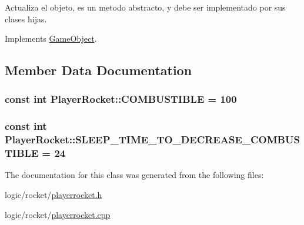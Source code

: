 Actualiza el objeto, es un metodo abstracto, y debe ser implementado por sus clases hijas. 



Implements \hyperlink{class_game_object_ae83128d0e0efef691417779605ee037c}{Game\-Object}.



\subsection{Member Data Documentation}
\hypertarget{class_player_rocket_a6f6bd540c91552c079a394e34d25f2c8}{
\subsubsection[{C\-O\-M\-B\-U\-S\-T\-I\-B\-L\-E}]{\setlength{\rightskip}{0pt plus 5cm}const int Player\-Rocket\-::\-C\-O\-M\-B\-U\-S\-T\-I\-B\-L\-E = 100\hspace{0.3cm}{\ttfamily [static]}}}\label{class_player_rocket_a6f6bd540c91552c079a394e34d25f2c8}
\hypertarget{class_player_rocket_aa3f048b7f984ee944f8daeb35cc748c2}{
\subsubsection[{S\-L\-E\-E\-P\-\_\-\-T\-I\-M\-E\-\_\-\-T\-O\-\_\-\-D\-E\-C\-R\-E\-A\-S\-E\-\_\-\-C\-O\-M\-B\-U\-S\-T\-I\-B\-L\-E}]{\setlength{\rightskip}{0pt plus 5cm}const int Player\-Rocket\-::\-S\-L\-E\-E\-P\-\_\-\-T\-I\-M\-E\-\_\-\-T\-O\-\_\-\-D\-E\-C\-R\-E\-A\-S\-E\-\_\-\-C\-O\-M\-B\-U\-S\-T\-I\-B\-L\-E = 24\hspace{0.3cm}{\ttfamily [static]}}}\label{class_player_rocket_aa3f048b7f984ee944f8daeb35cc748c2}


The documentation for this class was generated from the following files\-:\begin{DoxyCompactItemize}
\item 
logic/rocket/\hyperlink{playerrocket_8h}{playerrocket.\-h}\item 
logic/rocket/\hyperlink{playerrocket_8cpp}{playerrocket.\-cpp}\end{DoxyCompactItemize}
